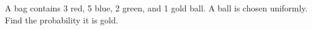 A bag contains 3 red, 5 blue, 2 green, and 1 gold ball. A ball is chosen uniformly. Find the probability it is gold.
